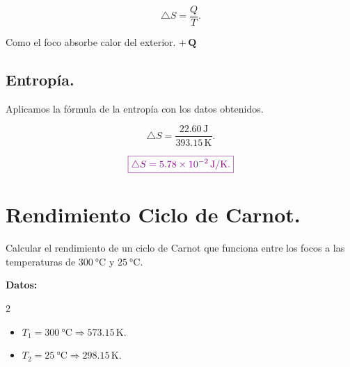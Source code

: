 \documentclass[a4paper,12pt]{article} %
\begin{document}
\[ \triangle S = \frac{Q}{T}. \]

\vspace{\baselineskip}

\begin{justify}
    Como el foco absorbe calor del exterior. \( \mathbf{+ \, Q} \)
\end{justify}

\subsection{Entropía.}

\begin{justify}
    Aplicamos la fórmula de la entropía con los datos obtenidos.
\end{justify}

\[ \triangle S = \frac{22.60 \, \mathrm{J}}{ 393.15 \, \mathrm{K}}. \]

\vspace{\baselineskip}

\[ \textcolor{violet}{\boxed{ \triangle S = 5.78 \times 10^{-2} \, \mathrm{J}/\mathrm{K}. }} \]

\vspace{\baselineskip}

\section{Rendimiento Ciclo de Carnot.}

\begin{justify}
    Calcular el rendimiento de un ciclo de Carnot que funciona entre los focos a las temperaturas de \( \SI{300}{\degreeCelsius} \) y \( \SI{25}{\degreeCelsius} \).
\end{justify}

\vspace{\baselineskip}

\begin{justify}
    \textbf{Datos:}
\end{justify}

\begin{multicols}{2}
    \begin{itemize}
        \item \( T_1 = \SI{300}{\degreeCelsius} \Rightarrow 573.15 \, \mathrm{K}. \)
        \item \( T_2 = \SI{25}{\degreeCelsius} \Rightarrow 298.15 \, \mathrm{K}. \)
    \end{itemize}
\end{multicols}
\end{document}
